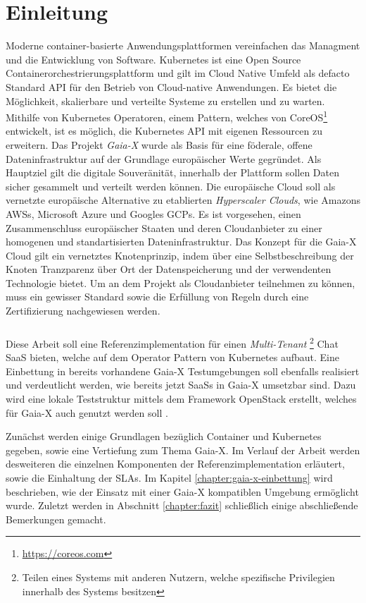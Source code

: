 \chapter{Einleitung}

Moderne container-basierte Anwendungsplattformen vereinfachen das Managment und die Entwicklung
von Software. Kubernetes \cite{kubernetes} ist eine Open Source Containerorchestrierungsplattform und gilt im
Cloud Native Umfeld als defacto Standard API für den Betrieb von Cloud-native Anwendungen.
Es bietet die Möglichkeit, skalierbare und verteilte Systeme zu erstellen und zu warten. \cite{Burns2019}
Mithilfe von Kubernetes Operatoren, einem Pattern, welches von CoreOS\footnote{\url{https://coreos.com}} entwickelt,
ist es möglich, die Kubernetes API mit eigenen Ressourcen zu erweitern.
Das Projekt \emph{Gaia-X} wurde als Basis für eine föderale, offene Dateninfrastruktur auf der Grundlage europäischer Werte gegründet.
Als Hauptziel gilt die digitale Souveränität, innerhalb der Plattform sollen Daten sicher gesammelt und verteilt werden können.
Die europäische Cloud soll als vernetzte europäische Alternative zu etablierten \emph{Hyperscaler Clouds}, wie Amazons \acp{AWS},
Microsoft Azure und Googles \acp{GCP}. Es ist vorgesehen, einen Zusammenschluss europäischer Staaten und deren
Cloudanbieter zu einer homogenen und standartisierten Dateninfrastruktur.
Das Konzept für die Gaia-X Cloud gilt ein vernetztes Knotenprinzip, indem über eine Selbstbeschreibung der Knoten
Tranzparenz über Ort der Datenspeicherung und der verwendenten Technologie bietet. Um an dem Projekt als Cloudanbieter
teilnehmen zu können, muss ein gewisser Standard sowie die Erfüllung von Regeln durch eine Zertifizierung nachgewiesen werden.\cite{BMWi2019}

\paragraph{}
Diese Arbeit soll eine Referenzimplementation für einen \emph{Multi-Tenant}
\footnote{Teilen eines Systems mit anderen Nutzern, welche spezifische Privilegien innerhalb des Systems besitzen}
Chat \ac{SaaS} bieten, welche auf dem Operator Pattern von Kubernetes aufbaut. 
Eine Einbettung in bereits vorhandene Gaia-X Testumgebungen soll ebenfalls realisiert und verdeutlicht werden,
wie bereits jetzt \acp{SaaS} in Gaia-X umsetzbar sind. Dazu wird eine lokale Teststruktur mittels dem Framework OpenStack erstellt,
welches für Gaia-X auch genutzt werden soll \cite{scs}. 

Zunächst werden einige Grundlagen bezüglich Container und Kubernetes gegeben, sowie eine Vertiefung zum Thema Gaia-X.
Im Verlauf der Arbeit werden desweiteren die einzelnen Komponenten der Referenzimplementation erläutert, sowie die Einhaltung der \acp{SLA}.
Im Kapitel \ref{chapter:gaia-x-einbettung} wird beschrieben, wie der Einsatz mit einer Gaia-X kompatiblen Umgebung ermöglicht wurde.
Zuletzt werden in Abschnitt \ref{chapter:fazit} schließlich einige abschließende Bemerkungen gemacht.